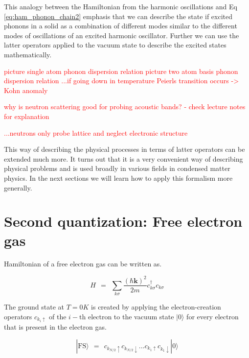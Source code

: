 \documentclass[10pt]{report}
\numberwithin{equation}{chapter}
\newcommand{\refEq}[1]{
  Eq  \ref{#1}
}
\newcommand{\vc}[1]{ %
  \mathbf{#1}
}
\begin{document}
This analogy between the Hamiltonian from the harmonic oscillations and \refEq{eq:ham_phonon_chain2} emphasis that we can describe the state if excited phonons in a solid as a combination of different modes similar to the different modes of oscillations of an excited harmonic oscillator. Further we can use the latter operators applied to the vacuum state to describe the excited states mathematically.

\textcolor{red}{picture single atom phonon dispersion relation}
\textcolor{red}{picture two atom basis phonon dispersion relation}
\textcolor{red}{...if going down in temperature Peierls transition occurs -> Kohn anomaly}

\textcolor{red}{why is neutron scattering good for probing acoustic bands? - check lecture notes for explanation}

\textcolor{red}{...neutrons only probe lattice and neglect electronic structure}


This way of describing the physical processes in terms of latter operators can be extended much more. 
It turns out that it is a very convenient way of describing physical problems and is used broadly in various fields in condensed matter physics. In the next sections we will learn how to apply this formalism more generally. 



%

\section{Second quantization: Free electron gas} %

Hamiltonian of a free electron gas can be written as. 

\begin{equation}
  H ~~=~~ \sum_{k \sigma} \frac{(\hbar \vc{k})^2}{2m} c_{k \sigma}^\dag c_{k \sigma}
\end{equation}


The ground state at $T=0K$ is created by applying the electron-creation operators $c_{k_i \uparrow}$ of the $i-\text{th}$ electron to the vacuum state $|0\rangle$ for every electron that is present in the electron gas. 

\begin{equation}
  | \text{FS} \rangle ~~=~~ c_{k_{N/2} \uparrow} c_{k_{N/2} \downarrow} ... c_{k_1 \uparrow} c_{k_1 \downarrow} | 0 \rangle 
\end{equation}
\end{document}
